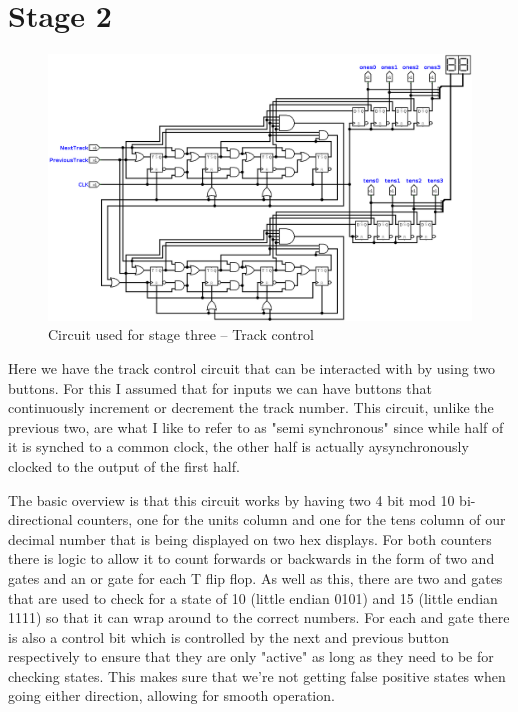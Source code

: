 \documentclass[11pt]{scrartcl}
\begin{document}
\pagebreak

\section*{Stage 2}
\begin{figure}[h]
    \centering
    \includegraphics[scale=0.3]{images/stagethree.png}
    \caption{Circuit used for stage three -- Track control}
\end{figure}
Here we have the track control circuit that can be interacted with by using two buttons. For
this I assumed that for inputs we can have buttons that continuously increment or decrement the
track number. This circuit, unlike the previous two, are what I like to refer to as "semi
synchronous" since while half of it is synched to a common clock, the other half is actually
aysynchronously clocked to the output of the first half.

\bigskip

The basic overview is that this circuit works by having two 4 bit mod 10 bi-directional
counters, one for the units column and one for the tens column of our decimal number that is
being displayed on two hex displays. For both counters there is logic to allow it to count
forwards or backwards in the form of two and gates and an or gate for each T flip flop. As well
as this, there are two and gates that are used to check for a state of 10 (little endian 0101) and
15 (little endian 1111) so that it can wrap around to the correct numbers. For each and gate there
is also a control bit which is controlled by the next and previous button respectively to ensure
that they are only "active" as long as they need to be for checking states. This makes sure that
we're not getting false positive states when going either direction, allowing for smooth operation.
\end{document}
